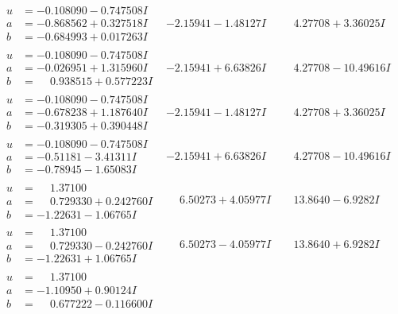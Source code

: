 \documentclass[1p]{elsarticle_modified}
\theoremstyle{definition}
\begin{document}
$$\begin{array}{c|c|c}
\begin{aligned}
u &= -0.108090 - 0.747508 I \\
a &= -0.868562 + 0.327518 I \\
b &= -0.684993 + 0.017263 I\end{aligned}
 & -2.15941 - 1.48127 I & \phantom{-}4.27708 + 3.36025 I \\ \hline\begin{aligned}
u &= -0.108090 - 0.747508 I \\
a &= -0.026951 + 1.315960 I \\
b &= \phantom{-}0.938515 + 0.577223 I\end{aligned}
 & -2.15941 + 6.63826 I & \phantom{-}4.27708 - 10.49616 I \\ \hline\begin{aligned}
u &= -0.108090 - 0.747508 I \\
a &= -0.678238 + 1.187640 I \\
b &= -0.319305 + 0.390448 I\end{aligned}
 & -2.15941 - 1.48127 I & \phantom{-}4.27708 + 3.36025 I \\ \hline\begin{aligned}
u &= -0.108090 - 0.747508 I \\
a &= -0.51181 - 3.41311 I \\
b &= -0.78945 - 1.65083 I\end{aligned}
 & -2.15941 + 6.63826 I & \phantom{-}4.27708 - 10.49616 I \\ \hline\begin{aligned}
u &= \phantom{-}1.37100\phantom{ +0.000000I} \\
a &= \phantom{-}0.729330 + 0.242760 I \\
b &= -1.22631 - 1.06765 I\end{aligned}
 & \phantom{-}6.50273 + 4.05977 I & \phantom{-}13.8640 - 6.9282 I \\ \hline\begin{aligned}
u &= \phantom{-}1.37100\phantom{ +0.000000I} \\
a &= \phantom{-}0.729330 - 0.242760 I \\
b &= -1.22631 + 1.06765 I\end{aligned}
 & \phantom{-}6.50273 - 4.05977 I & \phantom{-}13.8640 + 6.9282 I \\ \hline\begin{aligned}
u &= \phantom{-}1.37100\phantom{ +0.000000I} \\
a &= -1.10950 + 0.90124 I \\
b &= \phantom{-}0.677222 - 0.116600 I\end{aligned}

\end{array}$$
\end{document}
